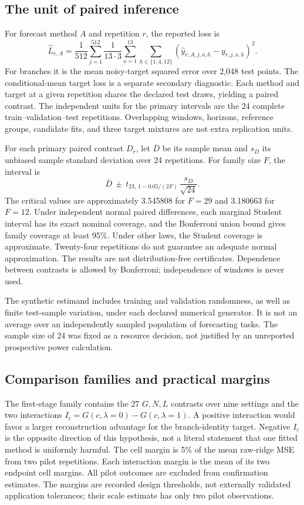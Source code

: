 \subsection{The unit of paired inference}

For forecast method $A$ and repetition $r$, the reported loss is
\[
 \widehat L_{r,A}=\frac1{512}\sum_{j=1}^{512}
      \frac1{13\cdot3}\sum_{o=1}^{13}\sum_{h\in\{1,4,12\}}
              (\widehat y_{r,A,j,o,h}-y_{r,j,o,h})^2.
\]
For branches it is the mean noisy-target squared error over 2,048
test points. The conditional-mean target loss is a separate secondary
diagnostic. Each method and target at a given repetition shares the
declared test draws, yielding a paired contrast. The independent units
for the primary intervals are the 24 complete train--validation--test
repetitions. Overlapping windows, horizons, reference groups, candidate
fits, and three target mixtures are not extra replication units.

For each primary paired contrast $D_r$, let $\overline D$ be its sample
mean and $s_D$ its unbiased sample standard deviation over 24 repetitions.
For family size $F$, the interval is
\[
 \overline D\ \mathbin{\pm}\
 t_{23,\,1-0.05/(2F)}\,\frac{s_D}{\sqrt{24}}.
\]
The critical values are approximately 3.545808 for $F=29$ and 3.180663
for $F=12$. Under independent normal paired differences, each marginal
Student interval has its exact nominal coverage, and the Bonferroni
union bound gives family coverage at least 95\%. Under other laws,
the Student coverage is approximate. Twenty-four repetitions do not
guarantee an adequate normal approximation. The results are not
distribution-free certificates. Dependence between contrasts is
allowed by Bonferroni; independence of windows is never used.

The synthetic estimand includes training and validation randomness,
as well as finite test-sample variation, under each declared numerical
generator. It is not an average over an independently sampled population
of forecasting tasks. The sample size of 24 was fixed as a resource
decision, not justified by an unreported prospective power calculation.

\subsection{Comparison families and practical margins}

The first-stage family contains the 27 $G,N,L$ contrasts over nine
settings and the two interactions
$I_c=G(c,\lambda=0)-G(c,\lambda=1)$. A positive interaction would
favor a larger reconstruction advantage for the branch-identity target.
Negative $I_c$ is the opposite direction of this hypothesis, not a
literal statement that one fitted method is uniformly harmful.
The cell margin is 5\% of the mean raw-ridge MSE from two pilot
repetitions. Each interaction margin is the mean of its two endpoint
cell margins. All pilot outcomes are excluded from confirmation
estimates. The margins are recorded design thresholds, not externally
validated application tolerances; their scale estimate has only two
pilot observations.


